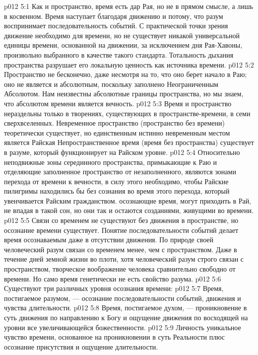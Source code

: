 \vs p012 5:1 Как и пространство, время есть дар Рая, но не в прямом смысле, а лишь в косвенном. Время наступает благодаря движению и потому, что разум воспринимает последовательность событий. С практической точки зрения движение необходимо для времени, но не существует никакой универсальной единицы времени, основанной на движении, за исключением дня Рая\hyp{}Хавоны, произвольно выбранного в качестве такого стандарта. Тотальность дыхания пространства разрушает его локальную ценность как источника времени.
\vs p012 5:2 Пространство не бесконечно, даже несмотря на то, что оно берет начало в Раю; оно не является и абсолютным, поскольку заполнено Неограниченным Абсолютом. Нам неизвестны абсолютные границы пространства, но мы знаем, что абсолютом времени является вечность.
\vs p012 5:3 \pc Время и пространство нераздельны только в творениях, существующих в пространстве\hyp{}времени, в семи сверхвселенных. Невременное пространство (пространство без времени) теоретически существует, но единственным истинно невременным местом является Райская  Непространственное время (время без пространства) существует в разуме, который функционирует на Райском уровне.
\vs p012 5:4 Относительно неподвижные зоны серединного пространства, примыкающие к Раю и отделяющие заполненное пространство от незаполненного, являются зонами перехода от времени к вечности, в силу этого необходимо, чтобы Райские пилигримы находились бы без сознания во время этого перехода, который увенчивается Райским гражданством.  осознающие время, могут приходить в Рай, не впадая в такой сон, но они так и остаются созданиями, живущими во времени.
\vs p012 5:5 \pc Связи со временем не существуют без движения в пространстве, но осознание времени существует. Понятие последовательности событий делает время осознаваемым даже в отсутствии движения. По природе своей человеческий разум связан со временем менее, чем с пространством. Даже в течение дней земной жизни во плоти, хотя человеческий разум строго связан с пространством, творческое воображение человека сравнительно свободно от времени. Но само время генетически не есть свойство разума.
\vs p012 5:6 \pc Существуют три различных уровня осознания времени:
\vs p012 5:7 \bibnobreakspace Время, постигаемое разумом, --- осознание последовательности событий, движения и чувства длительности.
\vs p012 5:8 \bibnobreakspace Время, постигаемое духом, --- проникновение в суть движения по направлению к Богу и ощущение движения по восходящей на уровни все увеличивающейся божественности.
\vs p012 5:9 \bibnobreakspace Личность  уникальное чувство времени, основанное на проникновении в суть Реальности плюс осознание присутствия и ощущение длительности.
